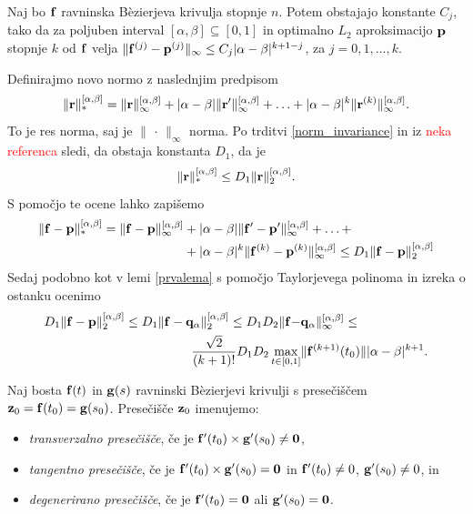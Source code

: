 \begin{lema}\label{drugalema}
Naj bo ${\bf f}$ ravninska B\`{e}zierjeva krivulja stopnje $n$. Potem obstajajo konstante $C_{j}$, tako da za poljuben interval $[\alpha,\beta]\subseteq[0,1]$ in optimalno $L_2$ aproksimacijo ${\bf p}$ stopnje $k$ od ${\bf f}$ velja
$\lVert {\bf f}^{(j)} - {\bf p}^{(j)} \rVert _{\infty} \leq C_{j}|\alpha - \beta|^{k+1-j}$, za $j=0,1,\ldots,k$. 
\end{lema}
\proof
Definirajmo novo normo z naslednjim predpisom
$$
\lVert {\bf r}\rVert _{*}^{[\alpha,\beta]} = \lVert {\bf r}\rVert _\infty^{[\alpha,\beta]} + |\alpha - \beta|\lVert {\bf r}'\rVert _\infty^{[\alpha,\beta]} + \ldots + 
 |\alpha - \beta|^k\lVert {\bf r}^{(k)}\rVert _\infty^{[\alpha,\beta]}.
$$
To je res norma, saj je $\lVert \,\cdot\, \rVert _\infty$ norma. Po trditvi \ref{norm_invariance} in iz \textcolor{Red}{neka referenca} sledi, da obstaja konstanta $D_1$, da je 
$$
\lVert {\bf r}\rVert _{*}^{[\alpha,\beta]} \leq D_1 \lVert {\bf r}\rVert _{2}^{[\alpha,\beta]}.
$$
S pomočjo te ocene lahko zapišemo 
\begin{align*}
\lVert {\bf f} - {\bf p}\rVert _{*}^{[\alpha,\beta]}  =  \lVert {\bf f} - {\bf p}\rVert _\infty^{[\alpha,\beta]}  &+  |\alpha - \beta|\lVert {\bf f}' - {\bf p}'\rVert _\infty^{[\alpha,\beta]} + \ldots +\\ 
   & +  |\alpha - \beta|^k\lVert {\bf f}^{(k)} - {\bf p}^{(k)}\rVert _\infty^{[\alpha,\beta]} \leq 
 D_1 \lVert {\bf f} - {\bf p}\rVert _{2}^{[\alpha,\beta]}
\end{align*}
Sedaj podobno kot v lemi \ref{prvalema} s pomočjo Taylorjevega polinoma in izreka o ostanku ocenimo
\begin{align*}
D_1 \lVert {\bf f} - {\bf p}\rVert _{2}^{[\alpha,\beta]} \leq 
D_1 \lVert {\bf f} - {\bf q}_\alpha\rVert _{2}^{[\alpha,\beta]} \leq 
D_1D_2 \lVert {\bf f} - &{\bf q}_\alpha\rVert _{\infty}^{[\alpha,\beta]} \leq \\
\frac{\sqrt{2}}{(k+1)!}  D_1D_2\max _{t\in [0,1]}& \lVert {\bf f}^{(k+1)}(t_0) \rVert |\alpha - \beta|^{k+1}.
\end{align*}
\endproof

\begin{definicija}
Naj bosta ${\bf f}(t)$ in ${\bf g}(s)$ ravninski B\`{e}zierjevi krivulji s presečiščem ${\bf z}_0 = {\bf f}(t_0) = {\bf g}(s_0)$. Presečišče ${\bf z}_0$ imenujemo:
\begin{itemize}
	\setlength\itemsep{0.33em}
\item {\em transverzalno presečišče}, če je ${\bf f}'(t_0)\times {\bf g}'(s_0) \neq {\bf 0}$,
\smallskip
\item {\em tangentno presečišče}, če je ${\bf f}'(t_0)\times {\bf g}'(s_0) = {\bf 0}$ in ${\bf f}'(t_0)\neq 0$, ${\bf g}'(s_0)\neq 0$, in 
\smallskip
\item {\em degenerirano presečišče}, če je ${\bf f}'(t_0) = {\bf 0}$ ali ${\bf g}'(s_0) = {\bf 0}$.
\end{itemize}
\end{definicija}


